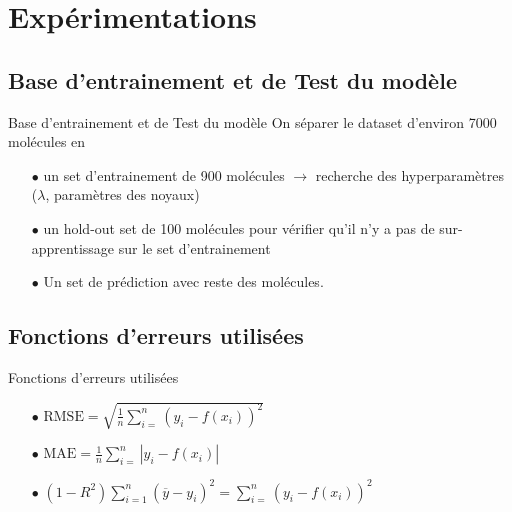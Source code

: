 \documentclass{beamer}
\begin{document}
\section{Expérimentations}
\subsection{Base d'entrainement et de Test du modèle}
\begin{frame}{Base d'entrainement et de Test du modèle}
On séparer le dataset d'environ 7000 molécules en \newline
\begin{itemize}
\item[$\bullet$] un set d'entrainement de 900 molécules $\rightarrow$ recherche des hyperparamètres ($\lambda$, paramètres des noyaux)
\newline
\item[$\bullet$] un hold-out set de 100 molécules pour vérifier qu'il n'y a pas de sur-apprentissage sur le set d'entrainement
\newline
\item[$\bullet$] Un set de prédiction avec reste des molécules.
\end{itemize}
\end{frame}
\subsection{Fonctions d'erreurs utilisées}
\begin{frame}{Fonctions d'erreurs utilisées}
\begin{itemize}
\item[$\bullet$] $\text{RMSE} = \sqrt{\frac{1}{n}\sum_{i=}^n {(y_i - f(x_i))^2}}$
\newline
\item[$\bullet$]$\text{MAE} = \frac{1}{n}\sum_{i=}^n {|y_i - f(x_i)|}$
\newline
\item[$\bullet$]$(1 - R^2) \sum_{i=1}^n {(\overline{y} - y_i)^2} = \sum_{i=}^n {(y_i - f(x_i))^2} $
\end{itemize}
\end{frame}
\end{document}
